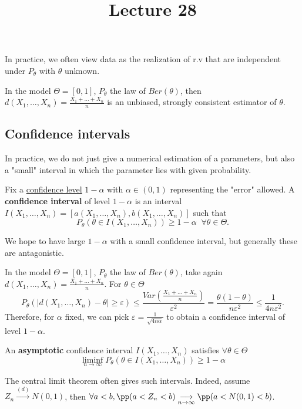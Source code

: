 \documentclass[../main.tex]{subfiles}
\title{Lecture 28}
\begin{document}
In practice, we often view data as the realization of r.v that are independent
under $P_\theta$ with $\theta$ unknown.
\begin{example}
  In the model $\Theta = [0,1]$, $P_\theta$ the law of $Ber(\theta)$, then
  $d(X_1, \ldots, X_n) = \frac{X_1 + \ldots + X_n}{n} $ is an unbiased,
  strongly consistent estimator of $\theta$.
\end{example}

\subsection{Confidence intervals}
In practice, we do not just give a numerical estimation of a parameters, but
also a "small" interval in which the parameter lies with given probability.
\begin{definition}
  Fix a \underline{confidence level} $1 - \alpha$ with $\alpha \in (0, 1)$
  representing the "error" allowed. A \textbf{confidence interval} of level $1 -
  \alpha$ is an interval $I(X_1, \ldots, X_n) = [a(X_1,\ldots, X_n),
  b(X_1,\ldots,X_n)]$ such that
  \[
    P_\theta (\theta \in I(X_1, \ldots, X_n)) \geq 1 - \alpha \;\; \forall
    \theta \in \Theta
  .\] 
\end{definition}

We hope to have large $1 - \alpha$ with a small confidence interval, but
generally these are antagonistic.

\begin{example}
  In the model $\Theta = [0,1]$, $P_\theta$ the law of $Ber(\theta)$, take again
  $d(X_1, \ldots, X_n) = \frac{X_1 + \ldots + X_n}{n} $. For $\theta \in \Theta$
  \[
    P_\theta (|d(X_1,\ldots, X_n) - \theta | \geq \varepsilon) \leq
    \frac{Var(\frac{X_1 + \ldots + X_n}{n} )}{\varepsilon^2} = \frac{\theta (1 -
    \theta)}{n \varepsilon^2} \leq \frac{1}{4n \varepsilon^2}
  .\]
  Therefore, for $\alpha$ fixed, we can pick $\varepsilon =
  \frac{1}{\sqrt{4n \alpha}}$ to obtain a confidence interval of level $1 -
  \alpha$.
\end{example}
An \textbf{asymptotic} confidence interval $I(X_1, \ldots, X_n)$ satisfies
$\forall \theta \in \Theta$ $$\liminf_{n \to \infty} P_\theta(\theta \in I(X_1,
\ldots, X_n) ) \geq 1 - \alpha$$ 

The central limit theorem often gives such intervals. Indeed, assume $Z_n
\overset{(d)}{\longrightarrow} N(0, 1)$, then $\forall a < b, \pp(a < Z_n < b)
\underset{n \to \infty}{\longrightarrow} \pp(a < N(0, 1) < b)$. 
\end{document}
